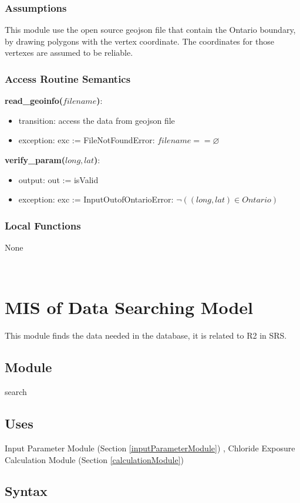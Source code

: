 \documentclass[12pt, titlepage]{article}
\begin{document}
\subsubsection{Assumptions}
This module use the open source geojson file that contain the Ontario boundary, by drawing polygons with the vertex coordinate. The coordinates for those vertexes are assumed to be reliable.

\subsubsection{Access Routine Semantics}
\noindent \textbf{read\_geoinfo($filename$)}:
\begin{itemize}
\item transition: access the data from geojson file
\item exception: exc := FileNotFoundError: $filename == \varnothing$
\end{itemize}
\noindent \textbf{verify\_param($long, lat$)}:
\begin{itemize}
\item output: out := isValid
\item exception: exc := InputOutofOntarioError: $\lnot ((long, lat) \in Ontario)$
\end{itemize}

\subsubsection{Local Functions}
None
  
~\newpage

\section{MIS of Data Searching Model} \label{dataSearchingModule} 
This module finds the data needed in the database, it is related to R2 in SRS.
\subsection{Module}

search

\subsection{Uses}
 Input Parameter Module (Section \ref{inputParameterModule})
, Chloride Exposure Calculation Module (Section \ref{calculationModule})


\subsection{Syntax}
\end{document}
